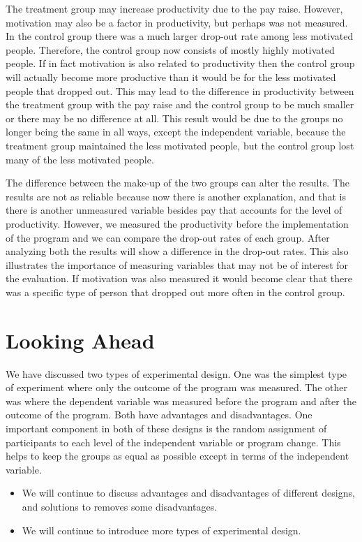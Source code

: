 \documentclass[]{book}
\theoremstyle{definition}
\theoremstyle{definition}
\theoremstyle{definition}
\theoremstyle{remark}
\begin{document}
The treatment group may increase productivity due to the pay raise.
However, motivation may also be a factor in productivity, but perhaps
was not measured. In the control group there was a much larger drop-out
rate among less motivated people. Therefore, the control group now
consists of mostly highly motivated people. If in fact motivation is
also related to productivity then the control group will actually become
more productive than it would be for the less motivated people that
dropped out. This may lead to the difference in productivity between the
treatment group with the pay raise and the control group to be much
smaller or there may be no difference at all. This result would be due
to the groups no longer being the same in all ways, except the
independent variable, because the treatment group maintained the less
motivated people, but the control group lost many of the less motivated
people.

The difference between the make-up of the two groups can alter the
results. The results are not as reliable because now there is another
explanation, and that is there is another unmeasured variable besides
pay that accounts for the level of productivity. However, we measured
the productivity before the implementation of the program and we can
compare the drop-out rates of each group. After analyzing both the
results will show a difference in the drop-out rates. This also
illustrates the importance of measuring variables that may not be of
interest for the evaluation. If motivation was also measured it would
become clear that there was a specific type of person that dropped out
more often in the control group.

\hypertarget{looking-ahead-11}{%
\section{Looking Ahead}\label{looking-ahead-11}}

We have discussed two types of experimental design. One was the simplest
type of experiment where only the outcome of the program was measured.
The other was where the dependent variable was measured before the
program and after the outcome of the program. Both have advantages and
disadvantages. One important component in both of these designs is the
random assignment of participants to each level of the independent
variable or program change. This helps to keep the groups as equal as
possible except in terms of the independent variable.

\begin{itemize}
\item
  We will continue to discuss advantages and disadvantages of different
  designs, and solutions to removes some disadvantages.
\item
  We will continue to introduce more types of experimental design.
\end{itemize}
\end{document}
